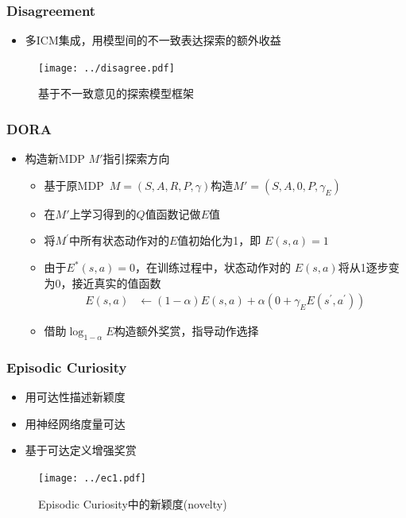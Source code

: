 \documentclass{beamer}
\begin{document}
\begin{CJK*}{GBK}{hei}
\begin{frame}\frametitle{Disagreement}
\begin{itemize}
\item 多ICM集成，用模型间的不一致表达探索的额外收益
\end{itemize}
        \begin{figure}[htbp]
            \centering\texttt{[image: ../disagree.pdf]}
	       \caption{基于不一致意见的探索模型框架\citep{pathak2019selfsupervised}}
        \end{figure}
\end{frame}

\begin{frame}\frametitle{DORA}
\begin{itemize}
\item 构造新MDP $M'$指引探索方向\citep{Choshen2018DORATE}
{\begin{itemize}
    \item 基于原MDP~$M=(S, A, R, P, \gamma)$构造$M'=\left(S, A, 0, P, \gamma_{E}\right)$
    \item 在$M'$上学习得到的$Q$值函数记做$E$值
    \item 将$M^{\prime}$中所有状态动作对的$E$值初始化为1，即 $E(s, a)=1$
    \item 由于$E^{*}(s, a)=0$，在训练过程中，状态动作对的 $E(s, a)$将从1逐步变为0，接近真实的值函数
    \begin{align*}
        E(s, a) &\leftarrow(1-\alpha) E(s, a)+\alpha\left(0+\gamma_{E} E\left(s^{\prime}, a^{\prime}\right)\right)
    \end{align*}
    \item 借助$\log _{1-\alpha} E$构造额外奖赏，指导动作选择
\end{itemize}
}
\end{itemize}
\end{frame}

\begin{frame}\frametitle{Episodic Curiosity}
\begin{itemize}
\item 用可达性描述新颖度
\item 用神经网络度量可达
\item 基于可达定义增强奖赏
\end{itemize}
        \begin{figure}[htbp]
            \centering\texttt{[image: ../ec1.pdf]}
	    \caption{Episodic Curiosity中的新颖度(novelty)\citep{Savinov2019EpisodicCT}}
        \end{figure}
\end{frame}


\end{CJK*}
\end{document}
